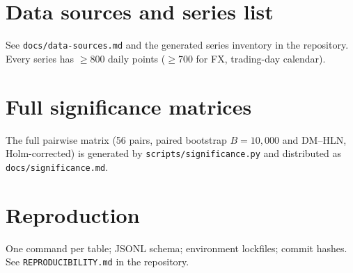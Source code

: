 \documentclass{article}
\begin{document}
\section{Data sources and series list}
See \texttt{docs/data-sources.md} and the generated series inventory in the repository. Every series has $\geq$800 daily points ($\geq$700 for FX, trading-day calendar).

\section{Full significance matrices}
The full pairwise matrix (56 pairs, paired bootstrap $B{=}10{,}000$ and DM--HLN, Holm-corrected) is generated by \texttt{scripts/significance.py} and distributed as \texttt{docs/significance.md}.

\section{Reproduction}
One command per table; JSONL schema; environment lockfiles; commit hashes. See \texttt{REPRODUCIBILITY.md} in the repository.
\end{document}
